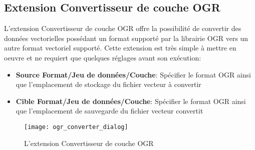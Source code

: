 
\subsection{Extension Convertisseur de couche OGR}


L'extension Convertisseur de couche OGR offre la possibilité de convertir des 
données vectorielles possédant un format supporté par la librairie OGR vers 
un autre format vectoriel supporté.
Cette extension est très simple à mettre en oeuvre et ne requiert que 
quelques réglages avant son exécution:

\begin{itemize}
\item \textbf{Source Format/Jeu de données/Couche}: Spécifier le format OGR 
ainsi que l'emplacement de stockage du fichier vecteur à convertir
\item \textbf{Cible Format/Jeu de données/Couche}: Spécifier le format OGR 
ainsi que l'emplacement de sauvegarde du fichier vecteur convertit
\end{itemize}

\begin{figure}[ht]
   \begin{center}
   \caption{L'extension Convertisseur de couche OGR \nixcaption}\label{fig:ogr_converter_dialog}\smallskip
   \texttt{[image: ogr\_converter\_dialog]}
\end{center}  
\end{figure}

